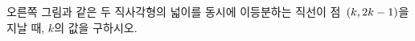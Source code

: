 \noindent\begin{minipage}[t]{0.58\linewidth}\vspace{0pt}\raggedright 오른쪽 그림과 같은 두 직사각형의 넓이를 동시에 이등분하는 직선이 점~$(k{,}\mkern3mu\mathopen{}2k-1)$을 지날 때, $k$의 값을 구하시오.\end{minipage}\hfill\begin{minipage}[t]{0.4\linewidth}\vspace{0pt}\centering \resizebox{\ifdim\width>\linewidth\linewidth\else\width\fi}{!}{}\end{minipage}\par
